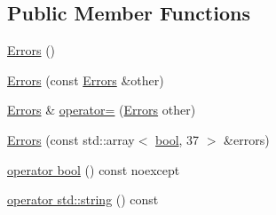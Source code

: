 \subsection*{Public Member Functions}
\begin{DoxyCompactItemize}
\item 
\hyperlink{structfranka_1_1Errors_aedd6b6af230c01b6f106b5050b29d9ae}{Errors} ()
\item 
\hyperlink{structfranka_1_1Errors_a4548a72089cc6d61c9249a1b8f4cc480}{Errors} (const \hyperlink{structfranka_1_1Errors}{Errors} \&other)
\item 
\hyperlink{structfranka_1_1Errors}{Errors} \& \hyperlink{structfranka_1_1Errors_a6c8a5f57fd238a83d112268764219bc9}{operator=} (\hyperlink{structfranka_1_1Errors}{Errors} other)
\item 
\hyperlink{structfranka_1_1Errors_a5f89cf2815adc679e232dcc6b8308c1b}{Errors} (const std\+::array$<$ \hyperlink{classbool}{bool}, 37 $>$ \&errors)
\item 
\hyperlink{structfranka_1_1Errors_a50cb6e50c1ce2b5ec281dcad83f1779e}{operator bool} () const noexcept
\item 
\hyperlink{structfranka_1_1Errors_a63ed1948f69db5be95a9c70107955d68}{operator std\+::string} () const
\end{DoxyCompactItemize}
